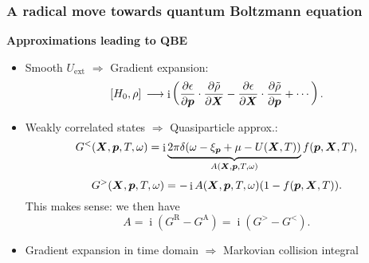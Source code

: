 \documentclass[t]{beamer}
\DeclareMathOperator{\ii}{i}
\begin{document}
\begin{frame}[allowframebreaks]
\frametitle{A radical move towards quantum Boltzmann equation}

\textbf{Approximations leading to QBE} \begin{itemize}
    \item Smooth $U_{\text{ext}}$ $\Rightarrow$ Gradient expansion:
    \begin{equation}
        \comm*{H_0}{\rho} \longrightarrow \ii \left(
            \pdv{\epsilon}{\vb*{p}} \cdot \pdv{\tilde{\rho}}{\vb*{X}}
            - \pdv{\epsilon}{\vb*{X}} \cdot \pdv{\tilde{\rho}}{\vb*{p}} + \cdots
        \right).
    \end{equation}
    \item Weakly correlated states $\Rightarrow$ Quasiparticle approx.: 
    \begin{equation}
       G^<(\vb*{X}, \vb*{p}, T, \omega) = 
       \ii \underbrace{2 \pi \delta(\omega - \xi_{\vb*{p}} + \mu - U(\vb*{X}, T))}_{A(\vb*{X}, \vb*{p}, T, \omega)} 
       f(\vb*{p}, \vb*{X}, T),
       \label{eq:qpa}
    \end{equation}
    \begin{equation}
        G^>(\vb*{X}, \vb*{p}, T, \omega) = - \ii A(\vb*{X}, \vb*{p}, T, \omega)
        (1 - f(\vb*{p}, \vb*{X}, T)).
    \end{equation}
    This makes sense: we then have 
    \begin{equation}
        A = \ii (G^{\text{R}} - G^{\text{A}}) = \ii (G^> - G^<).
    \end{equation}

    \item Gradient expansion in time domain $\Rightarrow$ Markovian collision integral
\end{itemize}    

\framebreak


\end{frame}
\end{document}
